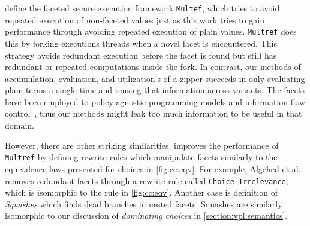 \citet{10.1145/3243734.3243806} define the faceted secure execution framework
\texttt{Multef}, which tries to avoid repeated execution of non-faceted values
just as this work tries to gain performance through avoiding repeated execution
of plain values. \texttt{Multref} does this by forking executions threads when a
novel facet is encountered. This strategy avoids redundant execution before the
facet is found but still has redundant or repeated computations inside the fork.
In contrast, our methods of accumulation, evaluation, and utilization's of a
zipper succeeds in only evaluating plain terms a single time and reusing that
information across variants. The facets have been employed to policy-agnostic
programming models and information flow control~\cite{IFC}, thus our methods
might leak too much information to be useful in that domain.

However, there are other striking similarities, \citet{optimisingFacets}
improves the performance of \texttt{Multref} by defining rewrite rules which
manipulate facets similarly to the equivalence laws presented for choices in
\autoref{fig:cc:eqv}. For example, Algehed et al. removes redundant facets
through a rewrite rule called \texttt{Choice Irrelevance}, which is isomorphic
to the  rule in \autoref{fig:cc:eqv}. Another case is definition of
\emph{Squashes} which finds dead branches in nested facets. Squashes are
similarly isomorphic to our discussion of \emph{dominating choices} in
\autoref{section:vpl:semantics}.



